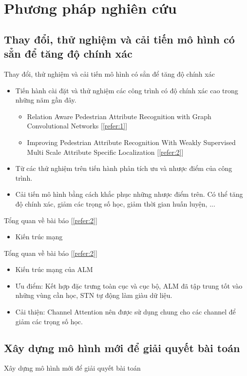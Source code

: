 \section{Phương pháp nghiên cứu}\label{sec:intro}
\frame{\tableofcontents[currentsection]}
\subsection{Thay đổi, thử nghiệm và cải tiến mô hình có sẳn để tăng độ chính xác}
\begin{frame}{Thay đổi, thử nghiệm và cải tiến mô hình có sẳn để tăng độ chính xác}

\begin{itemize}
    \item Tiến hành cài đặt và thử nghiệm các công trình có độ chính xác cao trong những năm gần đây.
    \begin{itemize}
        \item Relation Aware Pedestrian Attribute Recognition with Graph Convolutional Networks [\ref{refer:1}]
        \item Improving Pedestrian Attribute Recognition With Weakly Supervised Multi Scale Attribute Specific Localization [\ref{refer:2}]
    \end{itemize}
    \item Từ các thử nghiệm trên tiến hành phân tích ưu và nhược điểm của công trình.
    \item Cải tiến mô hình bằng cách khắc phục những nhược điểm trên. Có thể tăng độ chính xác, giảm các trọng số học, giảm thời gian huấn luyện, ...
\end{itemize}
\end{frame}

\begin{frame}{Tổng quan về bài báo [\ref{refer:2}]}
\begin{itemize}
    \item Kiến trúc mạng
\end{itemize}
\end{frame}

\begin{frame}{Tổng quan về bài báo [\ref{refer:2}]}
\begin{itemize}
    \item Kiến trúc mạng của ALM
    \item Ưu điểm: Kết hợp đặc trưng toàn cục và cục bộ, ALM đã tập trung tốt vào những vùng cần học, STN tự động làm giàu dữ liệu.
    \item Cải thiện: Channel Attention nên được sử dụng chung cho các channel để giảm các trọng số học.
\end{itemize}
\end{frame}

\subsection{Xây dựng mô hình mới để giải quyết bài toán}
\begin{frame}{Xây dựng mô hình mới để giải quyết bài toán}
\end{frame}
